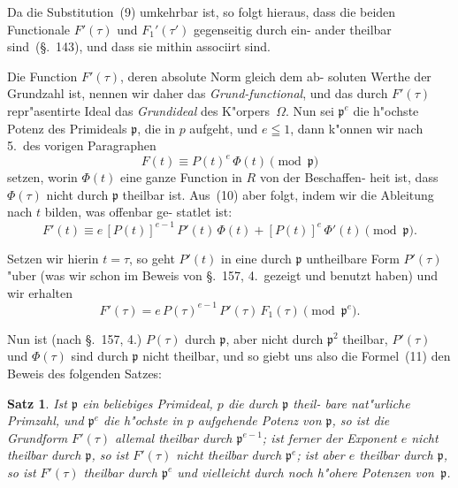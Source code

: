 \documentclass[12pt,a4paper]{article}
\theoremstyle{weber}
\newtheorem*{satz}{Satz}
\begin{document}
Da die Substitution~(9) umkehrbar ist, so folgt hieraus, dass
die beiden Functionale $F'(\tau)$ und $F_1'(\tau')$ gegenseitig durch ein-
ander theilbar sind~(\S.~143), und dass sie mithin associirt sind.

Die Function $F'(\tau)$, deren absolute Norm gleich dem ab-
soluten Werthe der Grundzahl ist, nennen wir daher das \emph{Grund-\allowbreak functional}, und das durch $F'(\tau)$ repr"asentirte Ideal das \emph{Grundideal} des K"orpers~$\varOmega$. Nun sei $\mathfrak{p}^e$ die h"ochste Potenz des
Primideals $\mathfrak{p}$, die in $p$ aufgeht, und $e \leqq 1$, dann k"onnen wir
nach 5.\ des vorigen Paragraphen
\begin{equation}\label{eq:10}
F(t) \equiv P(t)^e\,\varPhi(t) \pmod{\mathfrak{p}}
\end{equation}
setzen, worin $\varPhi(t)$ eine ganze Function in $R$ von der Beschaffen-
heit ist, dass $\varPhi(\tau)$ nicht durch $\mathfrak{p}$ theilbar ist. Aus~(10) aber
folgt, indem wir die Ableitung nach $t$ bilden, was offenbar ge-
statlet ist:
\[
F'(t) \equiv e\,[P(t)]^{e-1}\,P'(t)\,\varPhi(t) + [P(t)]^e\,\varPhi'(t) \pmod{\mathfrak{p}}.
\]

Setzen wir hierin $t = \tau$, so geht $P'(t)$ in eine durch $\mathfrak{p}$
untheilbare Form $P'(\tau)$ "uber (was wir schon im Beweis von
\S.~157, 4.\ gezeigt und benutzt haben) und wir erhalten
\begin{equation}\label{eq:11}
F'(\tau) = e\,P(\tau)^{e-1}\,P'(\tau)\,F_1(\tau) \pmod{\mathfrak{p}^e}.
\end{equation}

Nun ist (nach \S.~157, 4.) $P(\tau)$ durch $\mathfrak{p}$, aber nicht durch $\mathfrak{p}^2$
theilbar, $P'(\tau)$ und $\varPhi(\tau)$ sind durch $\mathfrak{p}$ nicht theilbar, und so
giebt uns also die Formel~(11) den Beweis des folgenden Satzes:

\begin{satz}
Ist $\mathfrak{p}$ ein beliebiges Primideal, $p$ die durch $\mathfrak{p}$ theil-
bare nat"urliche Primzahl, und $\mathfrak{p}^e$ die h"ochste in
$p$ aufgehende Potenz von $\mathfrak{p}$, so ist die Grundform
$F'(\tau)$ allemal theilbar durch $\mathfrak{p}^{e-1}$; ist ferner der
Exponent $e$ nicht theilbar durch $\mathfrak{p}$, so ist $F'(\tau)$ nicht
theilbar durch $\mathfrak{p}^e$; ist aber $e$ theilbar durch $\mathfrak{p}$,
so ist $F'(\tau)$ theilbar durch $\mathfrak{p}^e$ und vielleicht durch
noch h"ohere Potenzen von~$\mathfrak{p}$.
\end{satz}
\end{document}
